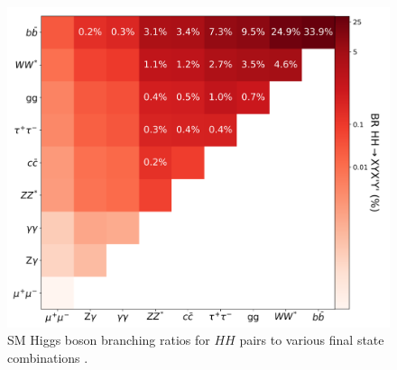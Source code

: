 \begin{figure}[!htp]
    \centering
    \includegraphics[width=.75\textwidth]{chapters/chapter1_theory/images/hh-brs.png}
    \caption{\gls{SM} Higgs boson branching ratios for $HH$ pairs to various final state combinations \cite{hh-whitepaper}.}
    \label{fig:hh-brs}
\end{figure}